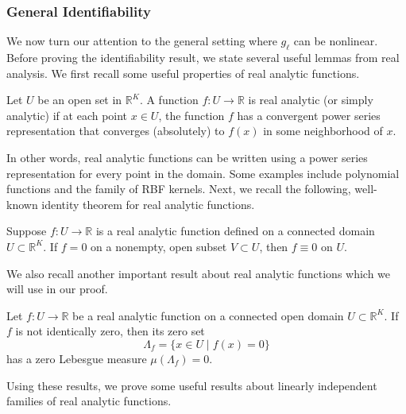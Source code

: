 \subsubsection{General Identifiability}
We now turn our attention to the general setting where $g_\ell$ can be  nonlinear. Before proving the identifiability result, we state several useful lemmas  from real analysis. We first recall some useful properties of real analytic functions.

\begin{definition} 
Let $U$ be an open set in $\mathbb{R}^K$. A function $f : U \rightarrow \mathbb{R}$ is real analytic (or simply analytic) if at each point $x \in U$, the function $f$ has a convergent power series representation that converges (absolutely) to $f(x)$ in some neighborhood of $x$.
\end{definition}

In other words, real analytic functions can be written using a power series representation for every point in the domain. Some examples include polynomial functions and the family of RBF kernels. Next, we recall the following, well-known identity theorem for real analytic functions.

\begin{lemma} \label{lemma:identity_thm_analytic}
    Suppose $f: U \rightarrow \mathbb{R}$ is a real analytic function defined on a connected domain $U \subset \mathbb{R}^K$. If $f=0$ on a nonempty, open subset $V \subset U$, then $f\equiv 0$ on $U$.
\end{lemma}

We also recall another important result about real analytic functions which we will use in our proof.
\begin{lemma} \label{lemma:zero_measure_analytic}
    Let $f : U \rightarrow \mathbb{R}$ be a real analytic function on a connected open domain $U \subset \mathbb{R}^K$. If $f$ is not identically zero, then its zero set
    \begin{equation*}
        \Lambda_f = \{ x \in U \mid f(x) = 0\}
    \end{equation*}
    has a zero Lebesgue measure $\mu(\Lambda_f) = 0$.
\end{lemma}

Using these results, we prove some useful results about linearly independent families of real analytic functions. 

